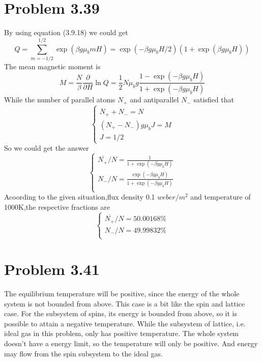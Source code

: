 \documentclass{article}
\begin{document}
\section*{Problem 3.39}
	By using equation (3.9.18) we could get
	\begin{equation*}
		Q=\sum_{m=-1/2}^{1/2}\exp(\beta g \mu_b mH)=\exp(-\beta g \mu_b H/2)(1+\exp(\beta g \mu_b H))
	\end{equation*}
	The mean magnetic moment is
	\begin{equation*}
		M=\frac{N}{\beta}\frac{\partial}{\partial H}\ln Q=\frac{1}{2}N\mu_b g\frac{1-\exp(-\beta g \mu_b H)}{1+\exp(-\beta g \mu_b H)}
	\end{equation*}
	While the number of parallel atoms $N_+$ and antiparallel $N_-$ satisfied that
	\begin{equation}
		\left\{
		\begin{aligned}
		\overset{.} N_+ +N_- =N\\
		(N_+ -N_-) g \mu_b J =M\\
		J=1/2
		\end{aligned}
		\right.
	\end{equation}
	So we could get the answer
	\begin{equation}
		\left\{
		\begin{aligned}
		\overset{.} 
		{N_+}/{N}=\frac{1}{1+\exp(-\beta g \mu_b H)}\\
		{N_-}/{N} =\frac{\exp(-\beta g \mu_b H)}{1+\exp(-\beta g \mu_b H)}\\
		\end{aligned}
		\right.
	\end{equation}
	Acoording to the given situation,flux density 0.1 $weber/m^2$ and temperature of 1000K,the respective fractions are
	\begin{equation}
		\left\{
		\begin{aligned}
		\overset{.} 
		{N_+}/{N}=50.00168\%\\
		{N_-}/{N} =49.99832\%\\
		\end{aligned}
		\right.
	\end{equation}
	
\section*{Problem 3.41}
	The equilibrium temperature will be positive, since the energy of the whole system is not bounded from above. This case is a bit like the spin and lattice case. For the subsystem of spins, its energy is bounded from above, so it is possible to attain a negative temperature. While the subsystem of lattice, i.e. ideal gas in this problem, only has positive temperature. The whole system doesn't have a energy limit, so the temperature will only be positive. And energy may flow from the spin subsystem to the ideal gas.
\end{document}

